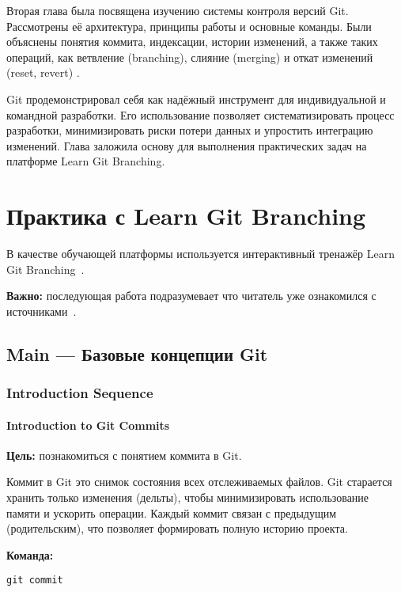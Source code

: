 \documentclass[a4paper,12pt]{report}
\begin{document}

Вторая глава была посвящена изучению системы контроля версий Git. Рассмотрены её архитектура, принципы работы и основные команды. Были объяснены понятия коммита, индексации, истории изменений, а также таких операций, как ветвление (branching), слияние (merging) и откат изменений (reset, revert) \cite{progit_book, git_official_doc}.

Git продемонстрировал себя как надёжный инструмент для индивидуальной и командной разработки. Его использование позволяет систематизировать процесс разработки, минимизировать риски потери данных и упростить интеграцию изменений. Глава заложила основу для выполнения практических задач на платформе Learn Git Branching.


\chapter{Практика с Learn Git Branching}\label{git_branching_practice}

В качестве обучающей платформы используется интерактивный тренажёр Learn Git Branching~\cite{learngitbranching}.

\textbf{Важно:} последующая работа подразумевает что читатель уже ознакомился с источниками~\cite{git_official_doc, progit_book, learngitbranching}.

\section{Main — Базовые концепции Git}

\subsection{Introduction Sequence}
\subsubsection{Introduction to Git Commits}
\textbf{Цель:} познакомиться с понятием коммита в Git.

Коммит в Git \textendash{} это снимок состояния всех отслеживаемых файлов. Git старается хранить только изменения (дельты), чтобы минимизировать использование памяти и ускорить операции. Каждый коммит связан с предыдущим (родительским), что позволяет формировать полную историю проекта.

\textbf{Команда:}
\begin{verbatim}
git commit
\end{verbatim}
\end{document}
